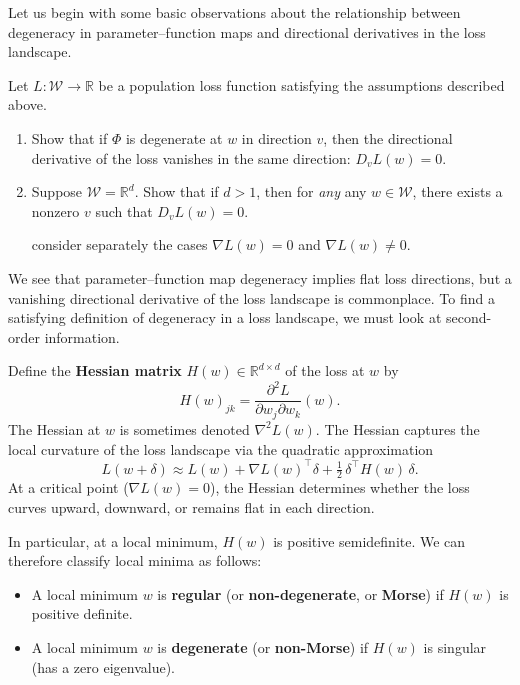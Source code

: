 \documentclass[11pt]{article}
\newcommand{\R}{\mathbb{R}}
\newcommand{\W}{\mathcal{W}}
\begin{document}
Let us begin with some basic observations about the relationship between degeneracy
in parameter--function maps and directional derivatives in the loss landscape.

\begin{exercise}
\label{ex:loss-basic}
Let $L : \W \to \R$ be a population loss function satisfying the assumptions described above.
\begin{enumerate}
    \item
        Show that if $\Phi$ is degenerate at $w$ in direction $v$, then the
        directional derivative of the loss vanishes in the same direction:
        $D_v L(w) = 0$.
    \item
        Suppose $\W = \R^d$. Show that if $d > 1$, then for \emph{any} any $w \in \W$, there exists a nonzero $v$
        such that $D_v L(w) = 0$. \begin{hint}
consider separately the cases $\nabla
        L(w) = 0$ and $\nabla L(w) \neq 0$.
        \end{hint}
\end{enumerate}
\end{exercise}

We see that parameter--function map degeneracy implies flat loss directions,
but a vanishing directional derivative of the loss landscape is commonplace. To
find a satisfying definition of degeneracy in a loss landscape, we must look at
second-order information.

Define the \textbf{Hessian matrix} $H(w) \in \R^{d \times d}$ of the loss at
$w$ by
\begin{equation}
    H(w)_{jk} = \frac{\partial^2 L}{\partial w_j \partial w_k}(w).
\end{equation}
The Hessian at $w$ is sometimes denoted $\nabla^2 L(w)$.
The Hessian captures the local curvature of the loss landscape via the
quadratic approximation
\begin{equation}
    L(w + \delta)
    \approx L(w)
    + \nabla L(w)^\top \delta
    + \tfrac{1}{2}\,\delta^\top H(w)\, \delta.
\end{equation}
At a critical point ($\nabla L(w) = 0$), the Hessian determines whether the
loss curves upward, downward, or remains flat in each direction.

In particular, at a local minimum, $H(w)$ is positive semidefinite. We can
therefore classify local minima as follows:
\begin{itemize}
    \item A local minimum $w$ is \textbf{regular} (or \textbf{non-degenerate},
        or \textbf{Morse}) if $H(w)$ is positive definite.
    \item A local minimum $w$ is \textbf{degenerate} (or \textbf{non-Morse}) if
        $H(w)$ is singular (has a zero eigenvalue).
\end{itemize}
\end{document}
